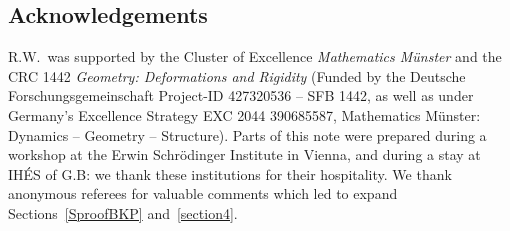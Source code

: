 \documentclass[10pt,a4paper]{amsart}
\numberwithin{equation}{section}
\begin{document}
\subsection*{Acknowledgements}

R.W.\ was supported by the Cluster of Excellence
\emph{Mathematics M\"unster} and the CRC 1442 \emph{Geometry:
 Deformations and Rigidity} (Funded by the Deutsche
 Forschungsgemeinschaft
 Project-ID 427320536 -- SFB 1442, as well as under Germany's
 Excellence Strategy EXC 2044 390685587, Mathematics M\"unster:
 Dynamics -- Geometry -- Structure). Parts of this note were prepared during
a workshop at the Erwin Schr\"odinger Institute in Vienna, and during a stay at IH\'ES of G.B: we thank these institutions for their hospitality. We thank anonymous referees for valuable comments which led to expand Sections~\ref{SproofBKP} and~\ref{section4}.

\newpage

\end{document}
